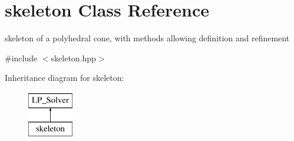 \hypertarget{classskeleton}{}\section{skeleton Class Reference}
\label{classskeleton}


skeleton of a polyhedral cone, with methods allowing definition and refinement  




{\ttfamily \#include $<$skeleton.\+hpp$>$}

Inheritance diagram for skeleton\+:\begin{figure}[H]
\begin{center}
\leavevmode
\includegraphics[height=2.000000cm]{classskeleton}
\end{center}
\end{figure}
